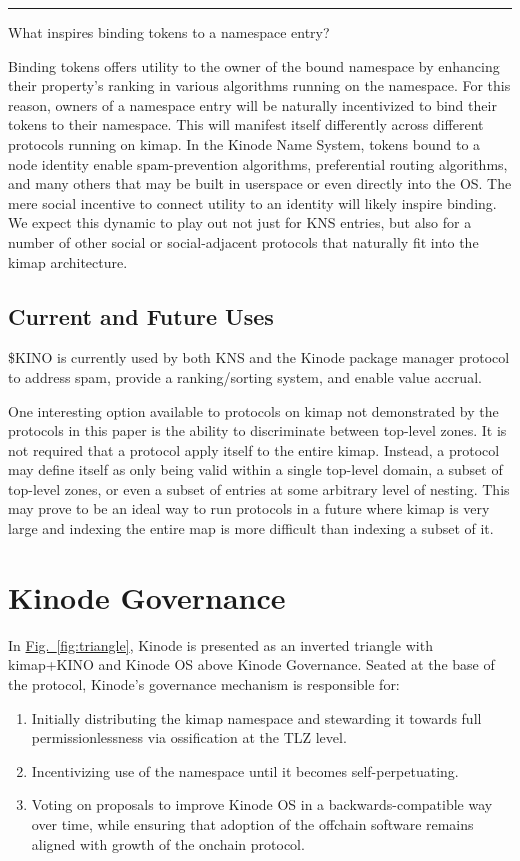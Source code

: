 \documentclass[runningheads]{llncs}
\begin{document}
\begin{center}
\noindent\rule{8cm}{0.4pt}
\end{center}

What inspires binding tokens to a namespace entry?

Binding tokens offers utility to the owner of the bound namespace by enhancing their property's ranking in various algorithms running on the namespace.
For this reason, owners of a namespace entry will be naturally incentivized to bind their tokens to their namespace.
This will manifest itself differently across different protocols running on kimap.
In the Kinode Name System, tokens bound to a node identity enable spam-prevention algorithms, preferential routing algorithms, and many others that may be built in userspace or even directly into the OS.
The mere social incentive to connect utility to an identity will likely inspire binding.
We expect this dynamic to play out not just for KNS entries, but also for a number of other social or social-adjacent protocols that naturally fit into the kimap architecture.

\subsection{Current and Future Uses}
\label{sec:kinouses}

\$KINO is currently used by both KNS and the Kinode package manager protocol to address spam, provide a ranking/sorting system, and enable value accrual.

One interesting option available to protocols on kimap not demonstrated by the protocols in this paper is the ability to discriminate between top-level zones.
It is not required that a protocol apply itself to the entire kimap.
Instead, a protocol may define itself as only being valid within a single top-level domain, a subset of top-level zones, or even a subset of entries at some arbitrary level of nesting.
This may prove to be an ideal way to run protocols in a future where kimap is very large and indexing the entire map is more difficult than indexing a subset of it.

\section{Kinode Governance}
\label{sec:governance}

In \hyperref[fig:triangle]{Fig.~\ref{fig:triangle}}, Kinode is presented as an inverted triangle with kimap+KINO and Kinode OS above Kinode Governance.
Seated at the base of the protocol, Kinode's governance mechanism is responsible for:
\begin{enumerate}
    \item Initially distributing the kimap namespace and stewarding it towards full permissionlessness via ossification at the TLZ level.
    \item Incentivizing use of the namespace until it becomes self-perpetuating.
    \item Voting on proposals to improve Kinode OS in a backwards-compatible way over time, while ensuring that adoption of the offchain software remains aligned with growth of the onchain protocol.
\end{enumerate}
\end{document}
